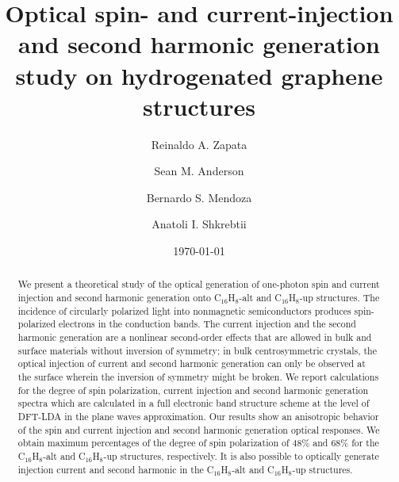 \documentclass[aps,pra,11pt,tightenlines,showpacs,superscriptaddress,groupedaddress]{revtex4-1}
\newcommand{\altstc}{C$_{16}$H$_{8}$-alt}
\newcommand{\upstc}{C$_{16}$H$_{8}$-up}
\begin{document}
\title{Optical spin- and current-injection and second harmonic generation study on hydrogenated graphene structures}

\author{Reinaldo A. Zapata}
\author{Sean M. Anderson}
\author{Bernardo S. Mendoza}
\author{Anatoli I. Shkrebtii}

\date{\today}



\begin{abstract}

We present a theoretical study of the optical generation of one-photon spin and
current injection and second harmonic generation onto {\altstc} and {\upstc} structures. The incidence of
circularly polarized light into nonmagnetic semiconductors produces spin-
polarized electrons in the conduction bands. The current injection and the
second harmonic generation are a nonlinear second-order effects that are
allowed in bulk and surface materials without inversion of symmetry; in bulk 
centrosymmetric crystals, the optical injection of current and second harmonic generation can
only be observed at the surface wherein the inversion of symmetry might be
broken. We report calculations for the degree of spin polarization, current
injection and second harmonic generation spectra which are calculated in a full
electronic band structure scheme at the level of DFT-LDA in the plane waves
approximation. Our results show an anisotropic behavior of the spin and
current injection and second harmonic generation optical responses. We obtain
maximum percentages of the degree of spin polarization of 48\% and 68\% for the
{\altstc} and {\upstc} structures, respectively. It is also possible to
optically generate injection current and second harmonic in the {\altstc} and
{\upstc} structures.

\end{abstract}


\end{document}
